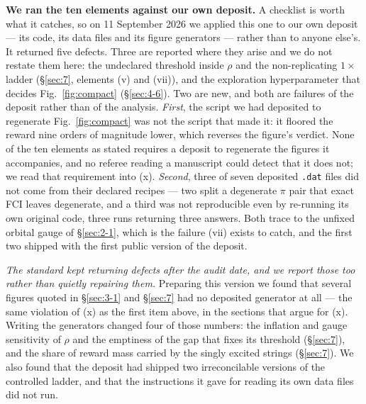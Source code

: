 \documentclass[onecolumn,a4paper]{quantumarticle}
\begin{document}
\textbf{We ran the ten elements against our own deposit.} A checklist is worth what it catches, so on 11 September 2026 we applied this one to our own deposit --- its code, its data files and its figure generators --- rather than to anyone else's. It returned five defects. Three are reported where they arise and we do not restate them here: the undeclared threshold inside $\rho$ and the non-replicating $1\times$ ladder (\S\ref{sec:7}, elements (v) and (vii)), and the exploration hyperparameter that decides Fig.~\ref{fig:compact} (\S\ref{sec:4-6}). Two are new, and both are failures of the deposit rather than of the analysis. \emph{First}, the script we had deposited to regenerate Fig.~\ref{fig:compact} was not the script that made it: it floored the reward nine orders of magnitude lower, which reverses the figure's verdict. None of the ten elements as stated requires a deposit to regenerate the figures it accompanies, and no referee reading a manuscript could detect that it does not; we read that requirement into (x). \emph{Second}, three of seven deposited \texttt{.dat} files did not come from their declared recipes --- two split a degenerate $\pi$ pair that exact FCI leaves degenerate, and a third was not reproducible even by re-running its own original code, three runs returning three answers. Both trace to the unfixed orbital gauge of \S\ref{sec:2-1}, which is the failure (vii) exists to catch, and the first two shipped with the first public version of the deposit.

\emph{The standard kept returning defects after the audit date, and we report those too rather than quietly repairing them.} Preparing this version we found that several figures quoted in \S\ref{sec:3-1} and \S\ref{sec:7} had no deposited generator at all --- the same violation of (x) as the first item above, in the sections that argue for (x). Writing the generators changed four of those numbers: the inflation and gauge sensitivity of $\rho$ and the emptiness of the gap that fixes its threshold (\S\ref{sec:7}), and the share of reward mass carried by the singly excited strings (\S\ref{sec:7}). We also found that the deposit had shipped two irreconcilable versions of the controlled ladder, and that the instructions it gave for reading its own data files did not run.
\end{document}
